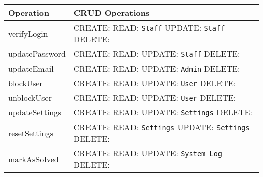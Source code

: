 \begin{table}[H]
	\centering
	\begin{tabular}{|p{5cm}|p{7cm}|}
		\hline
		\textbf{Operation} & \textbf{CRUD Operations} \\
		\hline
		verifyLogin &
		CREATE:\newline
		READ: \texttt{Staff} \newline
		UPDATE: \texttt{Staff} \newline
		DELETE: \\
		\hline
		updatePassword &
		CREATE:\newline
		READ: \newline
		UPDATE: \texttt{Staff}\newline
		DELETE: \\
		\hline
		updateEmail &
		CREATE:\newline
		READ: \newline
		UPDATE: \texttt{Admin}\newline
		DELETE: \\
		\hline
		blockUser &
		CREATE:\newline
		READ: \newline
		UPDATE: \texttt{User}\newline
		DELETE: \\
		\hline
		unblockUser &
		CREATE:\newline
		READ: \newline
		UPDATE: \texttt{User}\newline
		DELETE: \\
		\hline
		updateSettings &
		CREATE:\newline
		READ: \newline
		UPDATE: \texttt{Settings}\newline
		DELETE: \\
		\hline
		resetSettings &
		CREATE:\newline
		READ: \texttt{Settings}\newline
		UPDATE: \texttt{Settings}\newline
		DELETE: \\
		\hline
		markAsSolved &
		CREATE:\newline
		READ: \newline
		UPDATE: \texttt{System Log}\newline
		DELETE: \\
		\hline
	\end{tabular}
\end{table}

